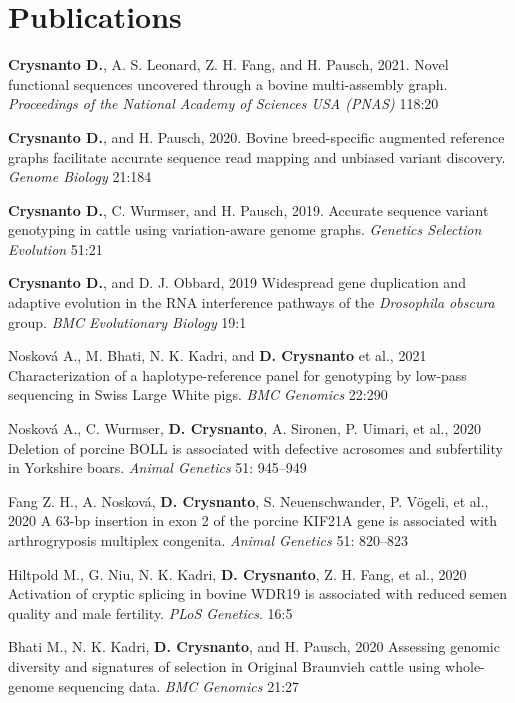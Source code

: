 \documentclass[letterpaper,10pt]{article}
\begin{document}
\section{Publications}
 \begin{enumerate}[leftmargin=0.3in]
    \small{\item{\textbf{Crysnanto D.}, A. S. Leonard, Z. H. Fang, and H. Pausch, 2021. Novel functional sequences uncovered through a bovine multi-assembly graph. \textit{Proceedings of the National Academy of Sciences USA (PNAS)} 118:20}
    \item{\textbf{Crysnanto D.}, and H. Pausch, 2020. Bovine breed-specific augmented reference graphs facilitate accurate sequence read mapping and unbiased variant discovery. \textit{Genome Biology} 21:184}
    \item{\textbf{Crysnanto D.}, C. Wurmser, and H. Pausch, 2019. Accurate sequence variant genotyping in cattle using variation-aware genome graphs. \textit{Genetics Selection Evolution} 51:21 }
    \item{\textbf{Crysnanto D.}, and D. J. Obbard, 2019 Widespread gene duplication and adaptive evolution in the RNA interference pathways of the \emph{Drosophila obscura} group. \textit{BMC Evolutionary Biology} 19:1}
    \item{Nosková A., M. Bhati, N. K. Kadri, and \textbf{D. Crysnanto} et al., 2021 Characterization of a haplotype-reference panel for genotyping by low-pass sequencing in Swiss Large White pigs. \emph{BMC Genomics} 22:290}
      
    \item{Nosková A., C. Wurmser, \textbf{D. Crysnanto}, A. Sironen, P. Uimari, et al., 2020 Deletion of porcine BOLL is associated with defective acrosomes and subfertility in Yorkshire boars. \textit{Animal Genetics} 51: 945–949}
    
    \item{Fang Z. H., A. Nosková, \textbf{D. Crysnanto}, S. Neuenschwander, P. Vögeli, et al., 2020 A 63-bp insertion in exon 2 of the porcine KIF21A gene is associated with arthrogryposis multiplex congenita. \textit{Animal Genetics} 51: 820–823}
    
    \item{Hiltpold M., G. Niu, N. K. Kadri, \textbf{D. Crysnanto}, Z. H. Fang, et al., 2020 Activation of cryptic splicing in bovine WDR19 is associated with reduced semen quality and male fertility. \textit{PLoS Genetics}. 16:5}
    
    \item{Bhati M., N. K. Kadri, \textbf{D. Crysnanto}, and H. Pausch, 2020 Assessing genomic diversity and signatures of selection in Original Braunvieh cattle using whole-genome sequencing data. \emph{BMC Genomics} 21:27} 
}
 \end{enumerate}
\end{document}
